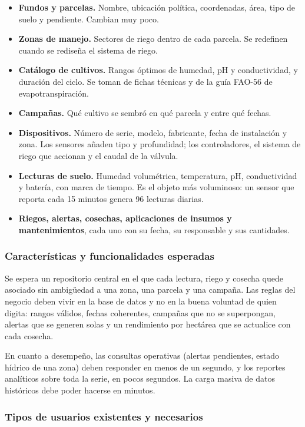 \documentclass[11pt,letterpaper]{article}
\begin{document}
\begin{itemize}[leftmargin=1.4em,itemsep=0.1em]
\item \textbf{Fundos y parcelas.} Nombre, ubicación política, coordenadas, área, tipo de suelo y pendiente. Cambian muy poco.
\item \textbf{Zonas de manejo.} Sectores de riego dentro de cada parcela. Se redefinen cuando se rediseña el sistema de riego.
\item \textbf{Catálogo de cultivos.} Rangos óptimos de humedad, pH y conductividad, y duración del ciclo. Se toman de fichas técnicas y de la guía FAO-56 de evapotranspiración.
\item \textbf{Campañas.} Qué cultivo se sembró en qué parcela y entre qué fechas.
\item \textbf{Dispositivos.} Número de serie, modelo, fabricante, fecha de instalación y zona. Los sensores añaden tipo y profundidad; los controladores, el sistema de riego que accionan y el caudal de la válvula.
\item \textbf{Lecturas de suelo.} Humedad volumétrica, temperatura, pH, conductividad y batería, con marca de tiempo. Es el objeto más voluminoso: un sensor que reporta cada 15 minutos genera 96 lecturas diarias.
\item \textbf{Riegos, alertas, cosechas, aplicaciones de insumos y mantenimientos}, cada uno con su fecha, su responsable y sus cantidades.
\end{itemize}

\subsubsection{Características y funcionalidades esperadas}

Se espera un repositorio central en el que cada lectura, riego y cosecha quede asociado sin ambigüedad a una zona, una parcela y una campaña. Las reglas del negocio deben vivir en la base de datos y no en la buena voluntad de quien digita: rangos válidos, fechas coherentes, campañas que no se superpongan, alertas que se generen solas y un rendimiento por hectárea que se actualice con cada cosecha.

En cuanto a desempeño, las consultas operativas (alertas pendientes, estado hídrico de una zona) deben responder en menos de un segundo, y los reportes analíticos sobre toda la serie, en pocos segundos. La carga masiva de datos históricos debe poder hacerse en minutos.

\subsubsection{Tipos de usuarios existentes y necesarios}
\end{document}
